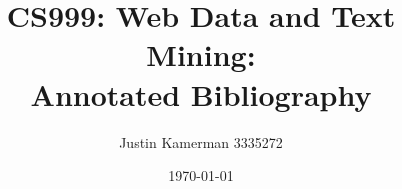\documentclass[10pt]{unbthesis}
\title{CS999: Web Data and Text Mining:\\ Annotated Bibliography}
\author{Justin Kamerman 3335272}
\date{\today}
\begin{document}
\maketitle
\nocite{*}



\end{document}
